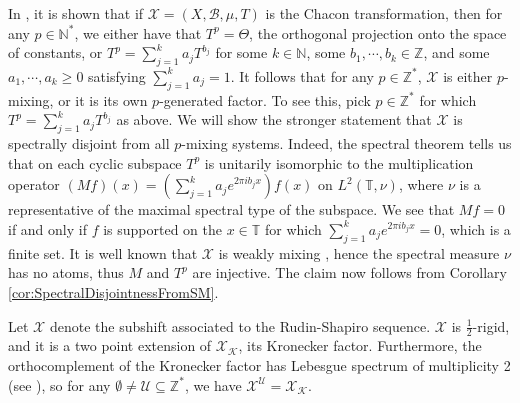 \documentclass[graybox]{svmult}
\theoremstyle{definition}
\begin{document}
\begin{example}\label{ex:Chacon}
    In \cite[Theorem 5.1]{PowersOfChacon}, it is shown that if $\mathcal{X} = (X,\mathscr{B},\mu,T)$ is the Chacon transformation, then for any $p \in \mathbb{N}^*$, we either have that $T^p = \Theta$, the orthogonal projection onto the space of constants, or $T^p = \sum_{j = 1}^ka_jT^{b_j}$ for some $k \in \mathbb{N}$, some $b_1,\cdots,b_k \in \mathbb{Z}$, and some $a_1,\cdots,a_k \ge 0$ satisfying $\sum_{j = 1}^ka_j = 1$.
    It follows that for any $p \in \mathbb{Z}^*$, $\mathcal{X}$ is either $p$-mixing, or it is its own $p$-generated factor.
    To see this, pick $p \in \mathbb{Z}^*$ for which $T^p = \sum_{j = 1}^ka_jT^{b_j}$ as above.
    We will show the stronger statement that $\mathcal{X}$ is spectrally disjoint from all $p$-mixing systems. 
    Indeed, the spectral theorem tells us that on each cyclic subspace $T^p$ is unitarily isomorphic to the multiplication operator $(Mf)(x) = (\sum_{j = 1}^ka_je^{2\pi i b_jx})f(x)$ on $L^2(\mathbb{T},\nu)$, where $\nu$ is a representative of the maximal spectral type of the subspace.
    We see that $Mf = 0$ if and only if $f$ is supported on the $x \in \mathbb{T}$ for which $\sum_{j = 1}^ka_je^{2\pi i b_jx} = 0$, which is a finite set.
    It is well known that $\mathcal{X}$ is weakly mixing \cite{OriginalChacon}, hence the spectral measure $\nu$ has no atoms, thus $M$ and $T^p$ are injective.
    The claim now follows from Corollary \ref{cor:SpectralDisjointnessFromSM}.
\end{example}

\begin{example}\label{ex:RudinShapiro}
    Let $\mathcal{X}$ denote the subshift associated to the Rudin-Shapiro sequence.
    $\mathcal{X}$ is $\frac{1}{2}$-rigid, and it is a two point extension of $\mathcal{X}_\mathcal{K}$, its Kronecker factor.
    Furthermore, the orthocomplement of the Kronecker factor has Lebesgue spectrum of multiplicity 2 (see \cite{NewPropertyOfRS}), so for any $\emptyset \neq \mathcal{U} \subseteq \mathbb{Z}^*$, we have $\mathcal{X}^\mathcal{U} = \mathcal{X}_\mathcal{K}$.   
\end{example}
\end{document}

